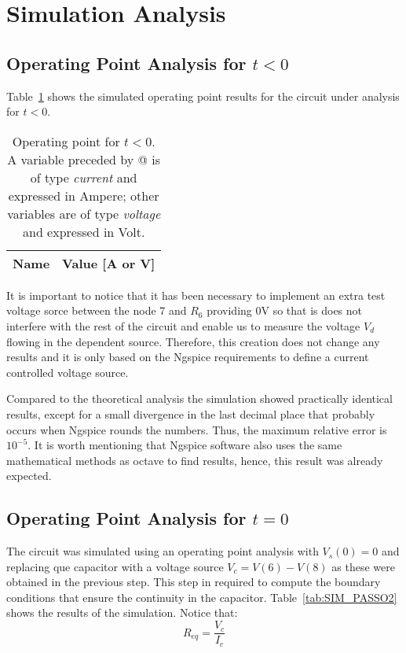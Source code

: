 \section{Simulation Analysis }
\label{sec:simulation}

\subsection{Operating Point Analysis for $t<0$}

Table~\ref{tab:SIM_PASSO1} shows the simulated operating point results for the circuit under analysis for $t<0$.
\begin{table}[h]
  \centering
  \begin{tabular}{|l|r|}
    \hline    
    {\bf Name} & {\bf Value [A or V]} \\ \hline
    
  \end{tabular}
  \caption{Operating point for $t<0$. A variable preceded by @ is of type {\em current}
    and expressed in Ampere; other variables are of type {\it voltage} and expressed in
    Volt.}
  \label{tab:SIM_PASSO1}
\end{table}

It is important to notice that it has been necessary to implement an extra test voltage sorce  between the node 7 and $R_6$ providing 0V so that is does not interfere with the rest of the circuit and enable us to measure the voltage $V_d$ flowing in the dependent source. Therefore, this creation does not change any results and it is only based on the Ngspice requirements to define a current controlled voltage source.

Compared to the theoretical analysis the simulation showed practically identical results, except for a small divergence in the last decimal place that probably occurs when Ngspice rounds the numbers. Thus, the maximum relative error is $10^{-5}$. It is worth mentioning that Ngspice software also uses the same mathematical methods as octave to find results, hence, this result was already expected.


\subsection{Operating Point Analysis for $t=0$}

The circuit was simulated using an operating point analysis with $V_s(0)=0$ and replacing que capacitor with a voltage source $V_c=V(6)-V(8)$ as these were obtained in the previous step. This step in required to compute the boundary conditions that ensure the continuity in the capacitor. Table~\ref{tab:SIM_PASSO2} shows the results of the simulation. Notice that:  \begin{equation}
R_{eq}=\frac{V_{c}}{I_{c}}
\end{equation}

